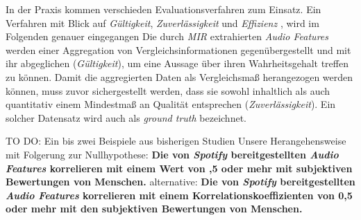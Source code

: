 In der Praxis kommen verschieden Evaluationsverfahren zum Einsatz.
Ein Verfahren mit Blick auf \textit{Gültigkeit}, \textit{Zuverlässigkeit} und \textit{Effizienz} \cite{Downie2004}, wird im Folgenden genauer eingegangen%
Die durch \textit{MIR} extrahierten \textit{Audio Features} werden einer Aggregation von Vergleichsinformationen gegenübergestellt und mit ihr abgeglichen (\textit{Gültigkeit}), um eine Aussage über ihren Wahrheitsgehalt treffen zu können.
Damit die aggregierten Daten als Vergleichsmaß herangezogen werden können, muss zuvor sichergestellt werden, dass sie sowohl inhaltlich als auch quantitativ einem Mindestmaß an Qualität entsprechen (\textit{Zuverlässigkeit}).
Ein solcher Datensatz wird auch als \textit{ground truth} bezeichnet.


TO DO:
Ein bis zwei Beispiele aus bisherigen Studien 
Unsere Herangehensweise mit Folgerung zur Nullhypothese:
\textbf{Die von \textit{Spotify} bereitgestellten \textit{Audio Features} korrelieren mit einem Wert von ,5 oder mehr mit subjektiven Bewertungen von Menschen.}
alternative: \textbf{Die von \textit{Spotify} bereitgestellten \textit{Audio Features} korrelieren mit einem Korrelationskoeffizienten von 0,5 oder mehr mit den subjektiven Bewertungen von Menschen.}
